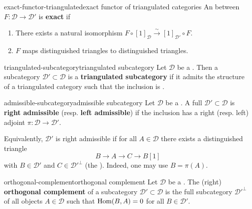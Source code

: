 \begin{topic}{exact-functor-triangulated}{exact functor of triangulated categories}
    An  between  $F : \mathcal{D} \to \mathcal{D}'$ is \textbf{exact} if
    \begin{enumerate}
        \item There exists a natural isomorphism $F \circ [1]_\mathcal{D} \xrightarrow{\sim} [1]_{\mathcal{D}'} \circ F$.
        \item $F$ maps distinguished triangles to distinguished triangles.
    \end{enumerate}
\end{topic}

\begin{topic}{triangulated-subcategory}{triangulated subcategory}
    Let $\mathcal{D}$ be a . Then a subcategory $\mathcal{D}' \subset \mathcal{D}$ is a \textbf{triangulated subcategory} if it admits the structure of a triangulated category such that the inclusion is .
\end{topic}

\begin{topic}{admissible-subcategory}{admissible subcategory}
    Let $\mathcal{D}$ be a . A full  $\mathcal{D}' \subset \mathcal{D}$ is \textbf{right admissible} (resp. \textbf{left admissible}) if the inclusion has a right (resp. left) adjoint $\pi : \mathcal{D} \to \mathcal{D}'$.
    
    Equivalently, $\mathcal{D}'$ is right admissible if for all $A \in \mathcal{D}$ there exists a distinguished triangle
    \[ B \to A \to C \to B[1] \]
    with $B \in \mathcal{D}'$ and $C \in {\mathcal{D}'}^\perp$ (the ). Indeed, one may use $B = \pi(A)$.
\end{topic}

\begin{topic}{orthogonal-complement}{orthogonal complement}
    Let $\mathcal{D}$ be a . The (right) \textbf{orthogonal complement} of a subcategory $\mathcal{D}' \subset \mathcal{D}$ is the full subcategory ${\mathcal{D}'}^\perp$ of all objects $A \in \mathcal{D}$ such that $\text{Hom}(B, A) = 0$ for all $B \in \mathcal{D}'$.
\end{topic}

